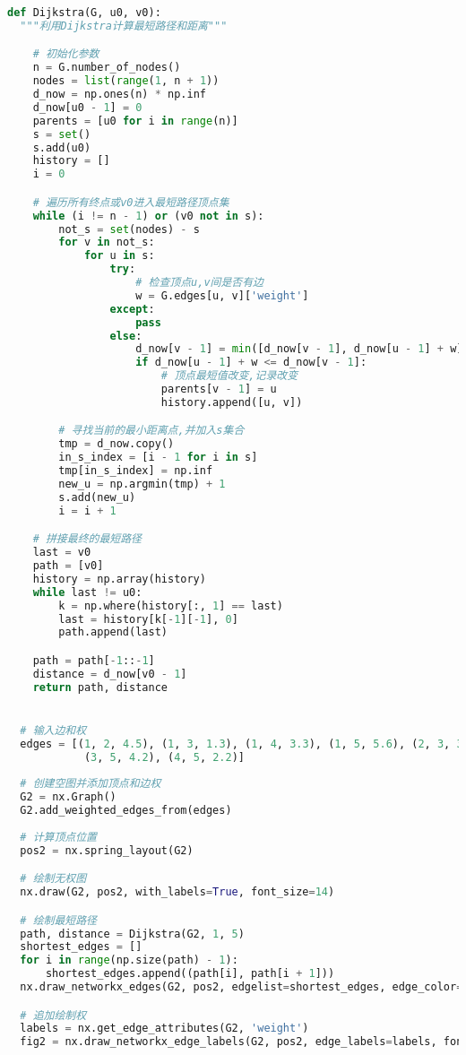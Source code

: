 \documentclass[withoutpreface]{cumcmthesis}
\begin{document}
  \begin{lstlisting}[language=python ,caption={Dijkstra算法} ]
  def Dijkstra(G, u0, v0):
  """利用Dijkstra计算最短路径和距离"""

    # 初始化参数
    n = G.number_of_nodes()
    nodes = list(range(1, n + 1))
    d_now = np.ones(n) * np.inf
    d_now[u0 - 1] = 0
    parents = [u0 for i in range(n)]
    s = set()
    s.add(u0)
    history = []
    i = 0

    # 遍历所有终点或v0进入最短路径顶点集
    while (i != n - 1) or (v0 not in s):
        not_s = set(nodes) - s
        for v in not_s:
            for u in s:
                try:
                    # 检查顶点u,v间是否有边
                    w = G.edges[u, v]['weight']
                except:
                    pass
                else:
                    d_now[v - 1] = min([d_now[v - 1], d_now[u - 1] + w])
                    if d_now[u - 1] + w <= d_now[v - 1]:
                        # 顶点最短值改变,记录改变
                        parents[v - 1] = u
                        history.append([u, v])

        # 寻找当前的最小距离点,并加入s集合
        tmp = d_now.copy()
        in_s_index = [i - 1 for i in s]
        tmp[in_s_index] = np.inf
        new_u = np.argmin(tmp) + 1
        s.add(new_u)
        i = i + 1

    # 拼接最终的最短路径
    last = v0
    path = [v0]
    history = np.array(history)
    while last != u0:
        k = np.where(history[:, 1] == last)
        last = history[k[-1][-1], 0]
        path.append(last)

    path = path[-1::-1]
    distance = d_now[v0 - 1]
    return path, distance


  # 输入边和权
  edges = [(1, 2, 4.5), (1, 3, 1.3), (1, 4, 3.3), (1, 5, 5.6), (2, 3, 3.2), (2, 4, 1.1), (2, 5, 0.9), (3, 4, 1.9),
            (3, 5, 4.2), (4, 5, 2.2)]
  
  # 创建空图并添加顶点和边权
  G2 = nx.Graph()
  G2.add_weighted_edges_from(edges)
  
  # 计算顶点位置
  pos2 = nx.spring_layout(G2)

  # 绘制无权图
  nx.draw(G2, pos2, with_labels=True, font_size=14)

  # 绘制最短路径
  path, distance = Dijkstra(G2, 1, 5)
  shortest_edges = []
  for i in range(np.size(path) - 1):
      shortest_edges.append((path[i], path[i + 1]))
  nx.draw_networkx_edges(G2, pos2, edgelist=shortest_edges, edge_color='red')

  # 追加绘制权
  labels = nx.get_edge_attributes(G2, 'weight')
  fig2 = nx.draw_networkx_edge_labels(G2, pos2, edge_labels=labels, font_color="green")
  \end{lstlisting}
\end{document}

